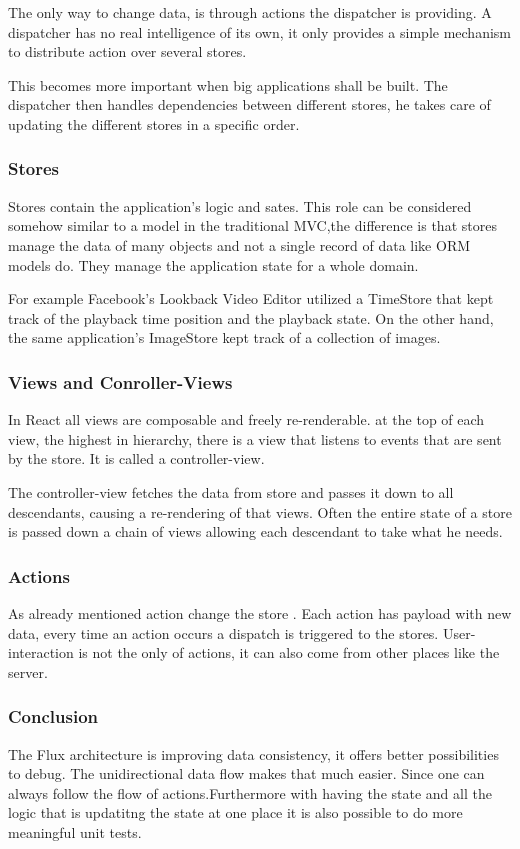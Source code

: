 The only way to change data, is through actions the dispatcher is providing.
A dispatcher has no real intelligence of its own, it only provides a simple mechanism to distribute action over several stores.

This becomes more important when big applications shall be built. The dispatcher then handles dependencies between different stores, he takes care of updating the different stores in a specific order.

\subsubsection{Stores}
Stores contain the application's logic and sates. This role can be considered somehow similar to a model in the traditional MVC,the difference is that stores manage the data of many objects and not a single record of data like ORM models do. They manage the application state for a whole domain. 

For example Facebook's Lookback Video Editor utilized a TimeStore that kept track of the playback time position and the playback state. On the other hand, the same application's ImageStore kept track of a collection of images.

\subsubsection{Views and Conroller-Views}

In React all views are composable and freely re-renderable. at the top of each view, the highest in hierarchy, there is a view that listens to events that are sent by the store. It is called a controller-view. 

The controller-view fetches the data from store and passes it down to all descendants, causing a re-rendering of that views. Often the entire state of a store is passed down a chain of views allowing each descendant to take what he needs.

\subsubsection{Actions}
As already mentioned action change the store . Each action has payload with new data, every time an action occurs a dispatch is triggered to the stores.
User-interaction is not the only of actions, it can also come from other places like the server.


\subsubsection{Conclusion}
The Flux architecture is improving data consistency, it offers better possibilities to debug. The unidirectional data flow makes that much easier. Since one can always follow the flow of actions.Furthermore with having the state and all the logic that is updatitng the state at one place  it is also possible to do more meaningful unit tests.

